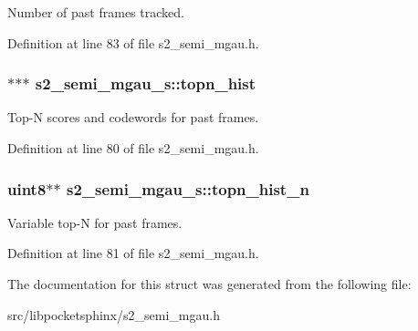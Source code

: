 Number of past frames tracked. 



Definition at line 83 of file s2\-\_\-semi\-\_\-mgau.\-h.

\subsubsection[{topn\-\_\-hist}]{$\ast$$\ast$$\ast$ s2\-\_\-semi\-\_\-mgau\-\_\-s\-::topn\-\_\-hist}\label{structs2__semi__mgau__s_a8892e22acbf81b08972cb6d7968ed4ce}


Top-\/\-N scores and codewords for past frames. 



Definition at line 80 of file s2\-\_\-semi\-\_\-mgau.\-h.

\subsubsection[{topn\-\_\-hist\-\_\-n}]{\setlength{\rightskip}{0pt plus 5cm}uint8$\ast$$\ast$ s2\-\_\-semi\-\_\-mgau\-\_\-s\-::topn\-\_\-hist\-\_\-n}\label{structs2__semi__mgau__s_acfe1e5d43a25418ef19afba837f85cf7}


Variable top-\/\-N for past frames. 



Definition at line 81 of file s2\-\_\-semi\-\_\-mgau.\-h.



The documentation for this struct was generated from the following file\-:\begin{DoxyCompactItemize}
\item 
src/libpocketsphinx/s2\-\_\-semi\-\_\-mgau.\-h\end{DoxyCompactItemize}
